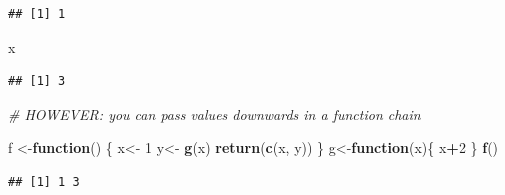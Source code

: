 \documentclass[]{article}
\newenvironment{Shaded}{\begin{snugshade}}{\end{snugshade}}
\newcommand{\KeywordTok}[1]{\textcolor[rgb]{0.13,0.29,0.53}{\textbf{#1}}}
\newcommand{\DecValTok}[1]{\textcolor[rgb]{0.00,0.00,0.81}{#1}}
\newcommand{\StringTok}[1]{\textcolor[rgb]{0.31,0.60,0.02}{#1}}
\newcommand{\CommentTok}[1]{\textcolor[rgb]{0.56,0.35,0.01}{\textit{#1}}}
\newcommand{\ControlFlowTok}[1]{\textcolor[rgb]{0.13,0.29,0.53}{\textbf{#1}}}
\newcommand{\OperatorTok}[1]{\textcolor[rgb]{0.81,0.36,0.00}{\textbf{#1}}}
\newcommand{\NormalTok}[1]{#1}
\begin{document}
\begin{verbatim}
## [1] 1
\end{verbatim}

\begin{Shaded}
\begin{Highlighting}[]
\NormalTok{x}
\end{Highlighting}
\end{Shaded}

\begin{verbatim}
## [1] 3
\end{verbatim}

\begin{Shaded}
\begin{Highlighting}[]
\CommentTok{# HOWEVER: you can pass values downwards in a function chain}

\NormalTok{f <-}\ControlFlowTok{function}\NormalTok{() \{}
\NormalTok{  x<-}\StringTok{ }\DecValTok{1}
\NormalTok{  y<-}\StringTok{ }\KeywordTok{g}\NormalTok{(x)}
  \KeywordTok{return}\NormalTok{(}\KeywordTok{c}\NormalTok{(x, y))}
\NormalTok{\}}
\NormalTok{g<-}\ControlFlowTok{function}\NormalTok{(x)\{}
\NormalTok{  x}\OperatorTok{+}\DecValTok{2}
\NormalTok{\}}
\KeywordTok{f}\NormalTok{()}
\end{Highlighting}
\end{Shaded}

\begin{verbatim}
## [1] 1 3
\end{verbatim}
\end{document}
